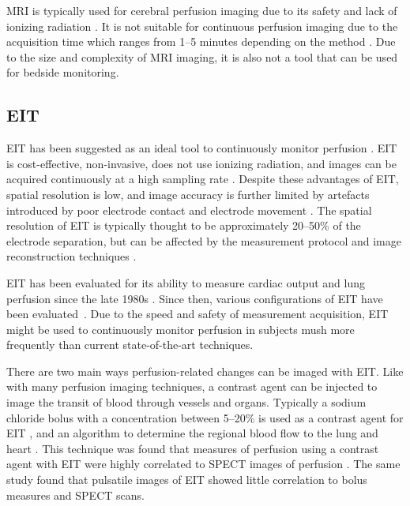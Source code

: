 MRI is typically used for cerebral perfusion imaging due to its safety and 
lack of ionizing radiation \parencite{watson_lessons_2015}. It is not suitable for 
continuous perfusion imaging due to the acquisition time which
ranges from 1--5 minutes depending on the method \parencite{essig_perfusion_2013}.
Due to the size and complexity of MRI imaging, it is also not a tool that can be used
for bedside monitoring.

\subsection{EIT}
EIT has been suggested as an ideal tool to continuously monitor 
perfusion \parencite{leonhardt_electrical_2012}. EIT is cost-effective,
non-invasive, does not use ionizing radiation, and images can be acquired 
continuously at a high sampling rate \parencite{adler_electrical_2017}.
Despite these advantages of EIT, 
spatial resolution is low, and image accuracy is further limited by 
artefacts introduced by poor electrode contact and electrode 
movement \parencite{adler_electrical_2017}.
The spatial resolution of EIT is typically thought to be approximately 20--50\% 
of the electrode separation, but can be affected by the measurement protocol 
and image reconstruction techniques \parencite{polydorides_electrode_2002}.

EIT has been evaluated for its ability to measure cardiac output and
lung perfusion since the late 1980s
\parencite{eyuboglu_vivo_1989,zadehkoochak_pulmonary_1992,brown_blood_1992,frerichs_regional_2002}.
Since then, various configurations of EIT have been 
evaluated~\parencite{borges_regional_2012,nguyen_perfusion_2015}.
Due to the speed and safety of measurement acquisition, EIT might be used to continuously monitor 
perfusion in subjects mush more frequently than current state-of-the-art techniques.

There are two main ways perfusion-related changes can be imaged with EIT. Like with many 
perfusion imaging techniques, a contrast agent can be injected to image the transit 
of blood through vessels and organs.
Typically a sodium chloride bolus with a concentration between 
5--20\% is used as a contrast agent for EIT \parencite{nguyen_review_2012}, 
and an algorithm to determine the regional blood flow to the lung and heart
\parencite{borges_regional_2012}. This technique was found that measures of perfusion 
using a contrast agent with EIT were highly correlated to SPECT images of perfusion
\parencite{borges_regional_2012}.
The same study found that pulsatile images of EIT showed little correlation to bolus measures 
and SPECT scans. 

